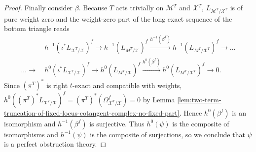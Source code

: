 \begin{proof}
  Finally consider \(\beta\). Because \(T\) acts trivially on \(\mathcal M^T\) and \(\mathcal X^T\), \(L_{\mathcal M^T/\mathcal X^T}\) is of pure weight zero and the weight-zero part of the long exact sequence of the bottom triangle reads
  \begin{align*}
    &h^{-1}(\iota^*L_{\mathcal X^T/\mathcal X})^f \to h^{-1}(L_{M^T/\mathcal X})^f \xrightarrow{h^{-1}(\beta^f)} h^{-1}(L_{M^T/\mathcal X^T})^f \to \dots\\\dots \to ~& h^{0}(\iota^*L_{\mathcal X^T/\mathcal X})^f \to h^{0}(L_{M^T/\mathcal X})^f \xrightarrow{h^{0}(\beta^f)} h^{0}(L_{M^T/\mathcal X^T})^f \to 0.
  \end{align*}
  Since \((\pi^T)^*\) is right \(t\)-exact and compatible with weights, \(h^0((\pi^T)^*L_{\mathcal X^T/\mathcal X})^f = (\pi^T)^*(\Omega^f_{\mathcal X^T/\mathcal X}) = 0\) by Lemma \ref{lem:two-term-truncation-of-fixed-locus-cotangent-complex-no-fixed-part}. Hence \(h^0(\beta^f)\) is an isomorphism and \(h^{-1}(\beta^f)\) is surjective. Thus \(h^0(\psi)\) is the composite of isomorphisms and \(h^{-1}(\psi)\) is the composite of surjections, so we conclude that \(\psi\) is a perfect obstruction theory.
\end{proof}
